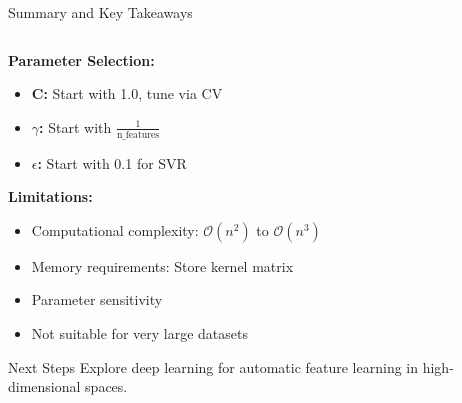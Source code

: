 \documentclass[8pt,aspectratio=1610]{beamer}
\begin{document}
\begin{frame}{Summary and Key Takeaways}
\begin{columns}[t]
\begin{column}{0.48\textwidth}
\vspace{0.3cm}
\textbf{Parameter Selection:}
\begin{itemize}
\setlength{\itemsep}{1pt}
\item \textbf{C:} Start with 1.0, tune via CV
\item \textbf{$\gamma$:} Start with $\frac{1}{\text{n\_features}}$
\item \textbf{$\epsilon$:} Start with 0.1 for SVR
\end{itemize}

\vspace{0.3cm}
\textbf{Limitations:}
\begin{itemize}
\setlength{\itemsep}{1pt}
\item Computational complexity: $\mathcal{O}(n^2)$ to $\mathcal{O}(n^3)$
\item Memory requirements: Store kernel matrix
\item Parameter sensitivity
\item Not suitable for very large datasets
\end{itemize}

\vspace{0.3cm}
\begin{alertblock}{Next Steps}
Explore deep learning for automatic feature learning in high-dimensional spaces.
\end{alertblock}
\end{column}
\end{columns}
\end{frame}
\end{document}
